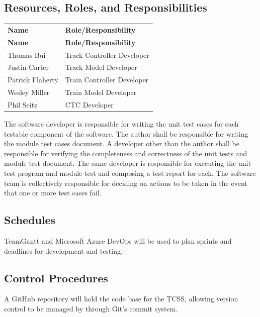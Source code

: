 \documentclass{article}
\begin{document}
    \subsection{Resources, Roles, and Responsibilities}
    \begin{longtable}{
            || >{\raggedright\arraybackslash}m{3.3cm} 
            | >{\raggedright\arraybackslash}m{3.3cm} 
            || } 
            \hline
            \textbf{Name} & \textbf{Role/Responsibility}\\
            \hhline{#==#}
            \endfirsthead
            
            \hline
            \hline
            \centering \textbf{Name} & \centering \textbf{Role/Responsibility}\\ 
            \hhline{#==#}
            \endhead
            \hline
            Thomas Bui & Track Controller Developer\\
            \hline
            Justin Carter & Track Model Developer\\
            \hline
            Patrick Flaherty & Train Controller Developer\\
            \hline
            Wesley Miller & Train Model Developer\\
            \hline
            Phil Seitz & CTC Developer\\
            \hline
        \end{longtable}
        \parargraph{}
        The software developer is responsible for writing the unit test cases for each testable component of the software. The author shall be responsible for writing the module test cases document. A developer other than the author shall be responsible for verifying the completeness and correctness of the unit tests and module test document. The same developer is responsible for executing the unit test program and module test and composing a test report for each. The software team is collectively responsible for deciding on actions to be taken in the event that one or more test cases fail.
    
    \subsection{Schedules}
    \parargraph{}
    TeamGantt and Microsoft Azure DevOps will be used to plan sprints and deadlines for development and testing.
    
    \subsection{Control Procedures}
    \parargraph{}
    A GitHub repository will hold the code base for the TCSS, allowing version control to be managed by through Git's commit system.
    
\end{document}
